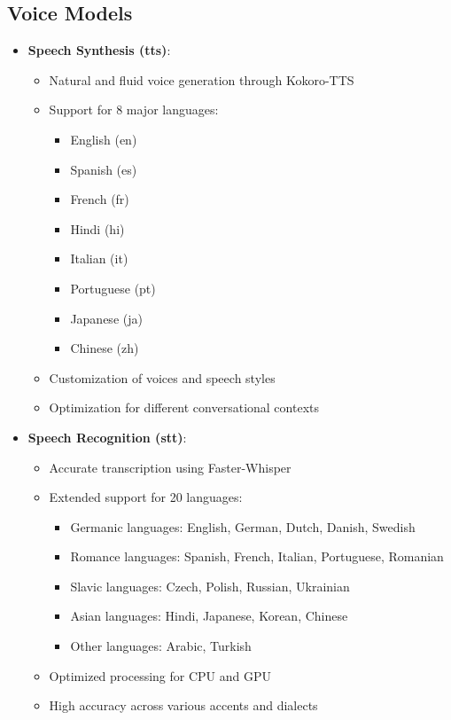 \subsection{Voice Models}
\begin{itemize}
	\item \textbf{Speech Synthesis (\gls{tts})}:
	      \begin{itemize}
		      \item Natural and fluid voice generation through Kokoro-TTS
		      \item Support for 8 major languages:
		            \begin{itemize}
			            \item English (en)
			            \item Spanish (es)
			            \item French (fr)
			            \item Hindi (hi)
			            \item Italian (it)
			            \item Portuguese (pt)
			            \item Japanese (ja)
			            \item Chinese (zh)
		            \end{itemize}
		      \item Customization of voices and speech styles
		      \item Optimization for different conversational contexts
	      \end{itemize}

	\item \textbf{Speech Recognition (\gls{stt})}:
	      \begin{itemize}
		      \item Accurate transcription using Faster-Whisper
		      \item Extended support for 20 languages:
		            \begin{itemize}
			            \item Germanic languages: English, German, Dutch, Danish, Swedish
			            \item Romance languages: Spanish, French, Italian, Portuguese, Romanian
			            \item Slavic languages: Czech, Polish, Russian, Ukrainian
			            \item Asian languages: Hindi, Japanese, Korean, Chinese
			            \item Other languages: Arabic, Turkish
		            \end{itemize}
		      \item Optimized processing for CPU and GPU
		      \item High accuracy across various accents and dialects
	      \end{itemize}
\end{itemize}


